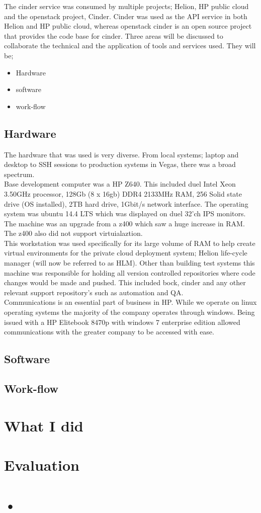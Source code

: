 \documentclass[11pt,a4paper]{report}
\begin{document}
The cinder service was consumed by multiple projects; Helion, HP public cloud and the openstack project, Cinder. Cinder was used as the API service in both Helion and HP public cloud, whereas openstack cinder is an open source project that provides the code base for cinder. Three areas will be discussed to collaborate the technical and the application of tools and services used. They will be;

\begin{itemize}
\item Hardware
\item software
\item work-flow
\end{itemize} 

\subsection{Hardware}
The hardware that was used is very diverse. From local systems; laptop and desktop to SSH sessions to production systems in Vegas, there was a broad spectrum.\\

Base development computer was a HP Z640. This included duel Intel Xeon 3.50GHz processor, 128Gb (8 x 16gb) DDR4 2133MHz RAM, 256 Solid state drive (OS installed), 2TB hard drive, 1Gbit/s network interface. The operating system was ubuntu 14.4 LTS which was displayed on duel 32'ch IPS monitors. The machine was an upgrade from a z400 which saw a huge increase in RAM. The z400 also did not support virtuialaztion.\\ This workstation was used specifically for its large volume of RAM to help create virtual environments for the private cloud deployment system; Helion life-cycle manager (will now be referred to as HLM). Other than building test systems this machine was responsible for holding all version controlled repositories where code changes would be made and pushed. This included bock, cinder and any other relevant support repository’s such as automation and QA. \\

Communications is an essential part of business in HP. While we operate on linux operating systems the majority of the company operates through windows. Being issued with a HP Elitebook 8470p with windows 7 enterprise edition allowed communications with the greater company to be accessed with ease. 


\subsection{Software}

\subsection{Work-flow}

\section{What I did}



\section{Evaluation}



\section{•}
\end{document}
